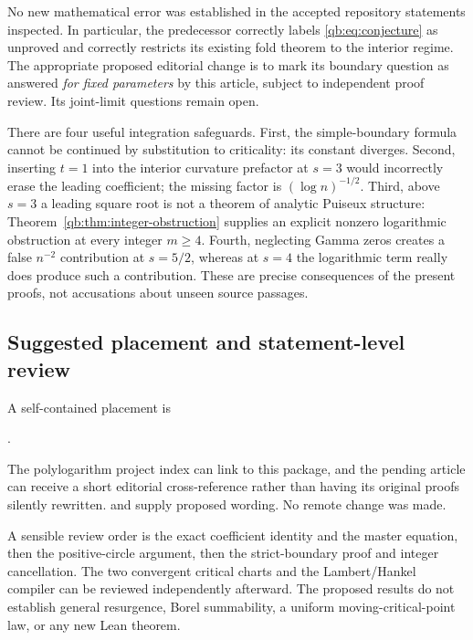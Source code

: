 \documentclass[11pt,a4paper]{article}
\theoremstyle{definition}\newtheorem{definition}[theorem]{Definition}
\theoremstyle{remark}\newtheorem{remark}[theorem]{Remark}
\numberwithin{equation}{section}
\begin{document}
No new mathematical error was established in the accepted repository
statements inspected. In particular, the predecessor correctly labels
\eqref{qb:eq:conjecture} as unproved and correctly restricts its existing
fold theorem to the interior regime. The appropriate proposed editorial
change is to mark its boundary question as answered \emph{for fixed
parameters} by this article, subject to independent proof review. Its
joint-limit questions remain open.

There are four useful integration safeguards.
First, the simple-boundary formula cannot be continued by substitution to
criticality: its constant diverges. Second, inserting $t=1$ into the
interior curvature prefactor at $s=3$ would incorrectly erase the leading
coefficient; the missing factor is $(\log n)^{-1/2}$. Third, above $s=3$
a leading square root is not a theorem of analytic Puiseux structure:
Theorem~\ref{qb:thm:integer-obstruction} supplies an explicit nonzero
logarithmic obstruction at every integer $m\ge4$. Fourth, neglecting
Gamma zeros creates a false $n^{-2}$ contribution at $s=5/2$, whereas at
$s=4$ the logarithmic term really does produce such a contribution.
These are precise consequences of the present proofs, not accusations
about unseen source passages.

\subsection{Suggested placement and statement-level review}

A self-contained placement is
\begin{center}\small
{}\par
{}.
\end{center}
The polylogarithm project index can link to this package, and the pending
article can receive a short editorial cross-reference rather than having
its original proofs silently rewritten.  and
 supply proposed wording. No remote change was
made.

A sensible review order is the exact coefficient identity and the master
equation, then the positive-circle argument, then the strict-boundary
proof and integer cancellation. The two convergent critical charts and
the Lambert/Hankel compiler can be reviewed independently afterward.
The proposed results do not establish general resurgence, Borel
summability, a uniform moving-critical-point law, or any new Lean theorem.
\end{document}
